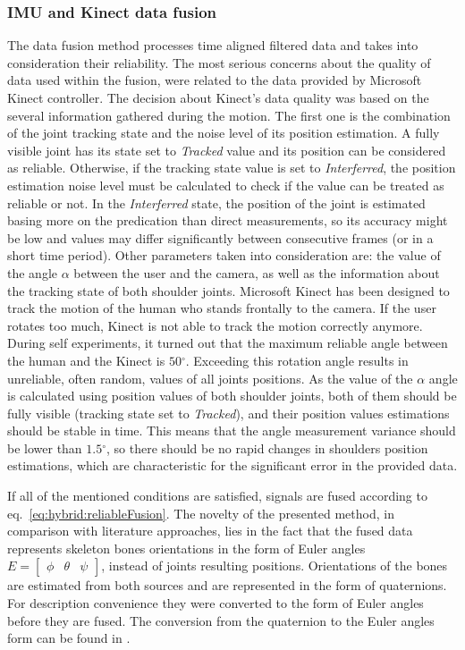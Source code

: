 \documentclass[sensors,article,submit,moreauthors,pdftex,10pt,a4paper]{mdpi}
\newcommand{\degree}{\ensuremath{{}^{\circ}}\xspace}
\begin{document}
	\subsubsection{IMU and Kinect data fusion}
	The data fusion method processes time aligned filtered data and takes into consideration their reliability. The most serious concerns about the quality of data used within the fusion, were related to the data provided by Microsoft Kinect controller. The decision about Kinect’s data quality was based on the several information gathered during the motion. The first one is the combination of the joint tracking state and the noise level of its position estimation. A fully visible joint has its state set to \emph{Tracked} value and its position can be considered as reliable. Otherwise, if the tracking state value is set to \emph{Interferred}, the position estimation noise level must be calculated to check if the value can be treated as reliable or not. In the \emph{Interferred} state, the position of the joint is estimated basing more on the predication than direct measurements, so its accuracy might be low and values may differ significantly between consecutive frames (or in a short time period). Other parameters taken into consideration are: the value of the angle $\alpha$ between the user and the camera, as well as the information about the tracking state of both shoulder joints. Microsoft Kinect has been designed to track the motion of the human who stands frontally to the camera. If the user rotates too much, Kinect is not able to track the motion correctly anymore. During self experiments, it turned out that the maximum reliable angle between the human and the Kinect is $50\degree$. Exceeding this rotation angle results in unreliable, often random, values of all joints positions. As the value of the $\alpha$ angle is calculated using position values of both shoulder joints, both of them should be fully visible (tracking state set to \emph{Tracked}), and their position values estimations should be stable in time. This means that the angle measurement variance should be lower than $1.5\degree$, so there should be no rapid changes in shoulders position estimations, which are characteristic for the significant error in the provided data. 
		
	If all of the mentioned conditions are satisfied, signals are fused according to eq.~\ref{eq:hybrid:reliableFusion}. The novelty of the presented method, in comparison with literature approaches, lies in the fact that the fused data represents skeleton bones orientations in the form of Euler angles $E = \begin{bmatrix} \phi &  \theta & \psi \end{bmatrix}$, instead of joints resulting positions. Orientations of the bones are estimated from both sources and are represented in the form of quaternions. For description convenience they were converted to the form of Euler angles before they are fused. The conversion from the quaternion to the Euler angles form can be found in \cite{Dunn2011}.
		
\end{document}
